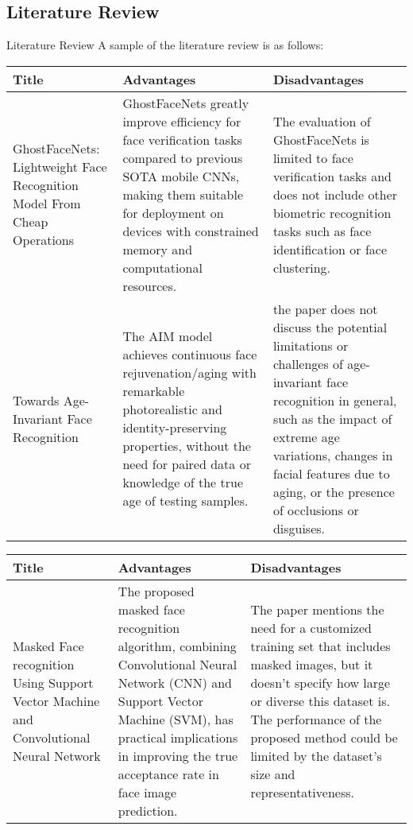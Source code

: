 \subsection{Literature Review}
\begin{frame}[allowframebreaks]{Literature Review}
	A sample of the literature review is as follows:
	{
		\scriptsize
		\newlength{\limwidth}
		\setlength{\limwidth}{5.75cm}
		\begin{table}[htbp]
			\begin{center}
			\begin{tabularx}{\columnwidth}{|X|X|X|}
			\hline
			\textbf{Title} & \textbf{Advantages}& \textbf{Disadvantages} \\
			\hline
			GhostFaceNets: Lightweight Face Recognition Model From Cheap Operations & GhostFaceNets greatly improve efficiency for face verification tasks compared to previous SOTA mobile CNNs, making them suitable for deployment on devices with constrained memory and computational resources. & The evaluation of GhostFaceNets is limited to face verification tasks and does not include other biometric recognition tasks such as face identification or face clustering.
			\\
			\hline
			Towards Age-Invariant Face Recognition & The AIM model achieves continuous face rejuvenation/aging with remarkable photorealistic and identity-preserving properties, without the need for paired data or knowledge of the true age of testing samples. & the paper does not discuss the potential limitations or challenges of age-invariant face recognition in general, such as the impact of extreme age variations, changes in facial features due to aging, or the presence of occlusions or disguises.\\
			\hline
		\end{tabularx}
		\end{center}
		\end{table}			
	\pagebreak
		\begin{table}[htbp]
			\begin{center}
			\begin{tabularx}{\columnwidth}{|X|X|X|}
			\hline
			\textbf{Title} & \textbf{Advantages}& \textbf{Disadvantages} \\
			\hline
			Masked Face recognition Using Support Vector Machine and Convolutional Neural Network & The proposed masked face recognition algorithm, combining Convolutional Neural Network (CNN) and Support Vector Machine (SVM), has practical implications in improving the true acceptance rate in face image prediction. & The paper mentions the need for a customized training set that includes masked images, but it doesn't specify how large or diverse this dataset is. The performance of the proposed method could be limited by the dataset's size and representativeness.

\end{tabularx}
\end{center}
\end{table}}
\end{frame}
